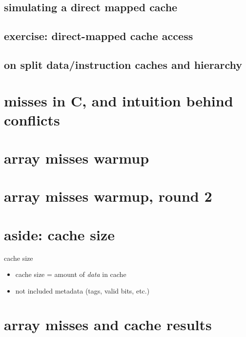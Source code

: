 \subsection{simulating a direct mapped cache}


\subsection{exercise: direct-mapped cache access}


\subsection{on split data/instruction caches and hierarchy}


\section{misses in C, and intuition behind conflicts}


\section{array misses warmup}


\section{array misses warmup, round 2}


\section{aside: cache size}
\begin{frame}{cache size}
    \begin{itemize}
    \item cache size = amount of \textit{data} in cache
    \item not included metadata (tags, valid bits, etc.)
    \end{itemize}
\end{frame}

\section{array misses and cache results}


